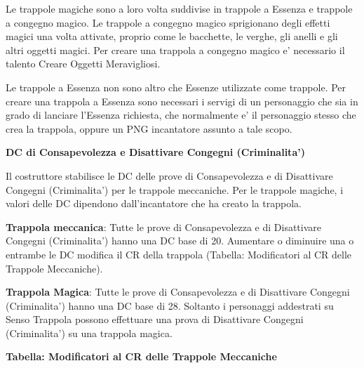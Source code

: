\documentclass[a4paper,11pt,twoside,openany]{book}
\begin{document}
Le trappole magiche sono a loro volta suddivise in trappole a Essenza e trappole a congegno magico. Le trappole a congegno magico sprigionano degli effetti magici una volta attivate, proprio come le bacchette, le verghe, gli anelli e gli altri oggetti magici. Per creare una trappola a congegno magico e' necessario il talento Creare Oggetti Meravigliosi. 

Le trappole a Essenza non sono altro che Essenze utilizzate come trappole. Per creare una trappola a Essenza sono necessari i servigi di un personaggio che sia in grado di lanciare l'Essenza richiesta, che normalmente e' il personaggio stesso che crea la trappola, oppure un PNG incantatore assunto a tale scopo.

\textbf{DC di Consapevolezza e Disattivare Congegni (Criminalita')}

Il costruttore stabilisce le DC delle prove di Consapevolezza e di Disattivare Congegni (Criminalita') per le trappole meccaniche. Per le trappole magiche, i valori delle DC dipendono dall'incantatore che ha creato la trappola.

\textbf{Trappola meccanica}: Tutte le prove di Consapevolezza e di Disattivare Congegni (Criminalita') hanno una DC base di 20. Aumentare o diminuire una o entrambe le DC modifica il CR della trappola (Tabella: Modificatori al CR delle Trappole Meccaniche). 

\textbf{Trappola Magica}: Tutte le prove di Consapevolezza e di Disattivare Congegni (Criminalita') hanno una DC base di 28. Soltanto i personaggi addestrati su Senso Trappola possono effettuare una prova di Disattivare Congegni (Criminalita') su una trappola magica.

\pagebreak

\textbf{Tabella: Modificatori al CR delle Trappole Meccaniche}
\end{document}
